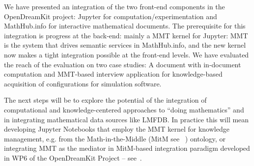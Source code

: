 We have presented an integration of the two front-end components in the OpenDreamKit project:
Jupyter for computation/experimentation and MathHub.info for interactive mathematical documents.
The prerequisite for this integration is progress at the back-end: mainly a MMT kernel for Jupyter:
MMT is the system that drives semantic services in MathHub.info, and the new kernel now makes a tight integration possible at the front-end levels.
We have evaluated the reach of the evaluation on two case studies: A document with in-document computation and MMT-based interview application for knowledge-based acquisition of configurations for simulation software.

The next steps will be to explore the potential of the integration of computational and knowledge-centered approaches to “doing mathematics” and in integrating mathematical data sources like LMFDB.
In practice this will mean developing Jupyter Notebooks that employ the MMT kernel for knowledge management, e.g. from the Math-in-the-Middle (MitM see ~\cite{ODK-D6.8}) ontology, or integrating MMT as the mediator in MitM-based integration paradigm developed in WP6 of the OpenDreamKit Project – see~\cite{ODK-D6.5}.



